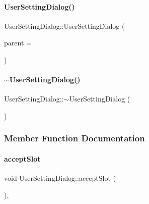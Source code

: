 \paragraph{\texorpdfstring{User\+Setting\+Dialog()}{UserSettingDialog()}}
{\footnotesize\ttfamily User\+Setting\+Dialog\+::\+User\+Setting\+Dialog (\begin{DoxyParamCaption}\item[{Q\+Widget $\ast$}]{parent = {} }\end{DoxyParamCaption})\hspace{0.3cm}{\ttfamily [explicit]}}

\mbox{\label{classUserSettingDialog_a49def01d834dfdd9df00ce9fd6c6f4dc}} 
\paragraph{\texorpdfstring{$\sim$\+User\+Setting\+Dialog()}{~UserSettingDialog()}}
{\footnotesize\ttfamily User\+Setting\+Dialog\+::$\sim$\+User\+Setting\+Dialog (\begin{DoxyParamCaption}{ }\end{DoxyParamCaption})}



\subsubsection{Member Function Documentation}
\mbox{\label{classUserSettingDialog_a2efff8a9633f90bd27c990180b87b104}} 
\paragraph{\texorpdfstring{accept\+Slot}{acceptSlot}}
{\footnotesize\ttfamily void User\+Setting\+Dialog\+::accept\+Slot (\begin{DoxyParamCaption}{ }\end{DoxyParamCaption})\hspace{0.3cm}{\ttfamily [private]}, {\ttfamily [slot]}}

